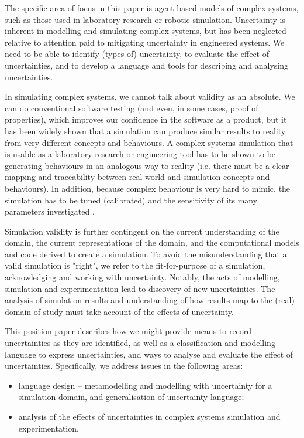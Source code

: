 \documentclass[sigconf,authordraft]{acmart}
\begin{document}
The specific area of focus in this paper is agent-based models of complex systems, such as those used in laboratory research or robotic simulation.  Uncertainty is inherent in modelling and simulating complex systems, but has been neglected relative to attention paid to mitigating uncertainty in engineered systems.  We need to be able to identify (types of) uncertainty, to evaluate the effect of uncertainties, and to develop a language and tools for describing and analysing uncertainties.  

In simulating complex systems, we cannot talk about validity as an absolute.  We can do conventional software testing (and even, in some cases, proof of properties), which improves our confidence in the software as a product, but it has been widely shown that a simulation can produce similar results to reality from very different concepts and behaviours\cite{iceccs-phil}.  A complex systems simulation that is usable as a laboratory research or engineering tool has to be shown to be generating behaviours in an analogous way to reality (i.e. there must be a clear mapping and traceability between real-world and simulation concepts and behaviours).  In addition, because complex behaviour is very hard to mimic, the simulation has to be tuned (calibrated) and the sensitivity of its many parameters investigated \cite{ReadSen,spartan}. 

Simulation validity is further contingent on the current understanding of the domain, the current representations of the domain, and the computational models and code derived to create a simulation.  To avoid the misunderstanding that a valid simulation is "right", we refer to the fit-for-purpose of a simulation, acknowledging and working with uncertainty.  Notably, the acts of modelling, simulation and experimentation lead to discovery of new uncertainties.  The analysis of simulation results and understanding of how results map to the (real) domain of study must take account of the effects of uncertainty.   

This position paper describes how we might provide means to record uncertainties as they are identified, as well as a classification and modelling language to express uncertainties, and ways to analyse and evaluate the effect of uncertainties.  Specifically, we address issues in the following areas:
\begin{itemize}
    \item language design -- metamodelling and modelling with uncertainty for a simulation domain, and generalisation of uncertainty language;
    \item analysis of the effects of uncertainties in complex systems simulation and experimentation.
\end{itemize}  
\end{document}
